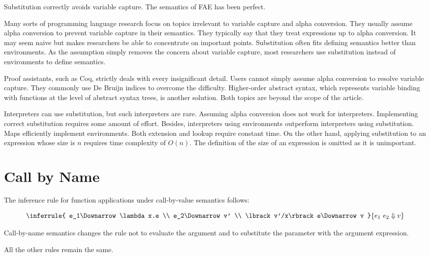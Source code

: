 Substitution correctly avoids variable capture. The semantics of FAE has been
perfect.

Many sorts of programming language research focus on topics irrelevant to
variable capture and alpha conversion. They usually assume alpha conversion to
prevent variable capture in their semantics. They typically say that they treat
expressions up to alpha conversion. It may seem naive but makes researchers be
able to concentrate on important points. Substitution often fits defining
semantics better than environments. As the assumption simply removes the concern
about variable capture, most researchers use substitution instead of environments
to define semantics.

Proof assistants, such as Coq, strictly deals with every insignificant detail.
Users cannot simply assume alpha conversion to resolve variable capture. They
commonly use De Bruijn indices to overcome the difficulty. Higher-order abstract
syntax, which represents variable binding with functions at the level of abstract
syntax trees, is another solution. Both topics are beyond the scope of the
article.

Interpreters can use substitution, but such interpreters are rare. Assuming alpha
conversion does not work for interpreters. Implementing correct substitution
requires some amount of effort. Besides, interpreters using environments
outperform interpreters using substitution. Maps efficiently implement
environments. Both extension and lookup require constant time. On the other hand,
applying substitution to an expression whose size is \(n\) requires time
complexity of \(O(n)\). The definition of the size of an expression is omitted as
it is unimportant.

\section{Call by Name
}

The inference rule for function applications under call-by-value semantics
follows:

\[
\inferrule{
  e_1\Downarrow \lambda x.e \\
  e_2\Downarrow v' \\
  \lbrack v'/x\rbrack e\Downarrow v
}
{ e_1\ e_2\Downarrow v }
\]

Call-by-name semantics changes the rule not to evaluate the argument and to
substitute the parameter with the argument expression.

All the other rules remain the same.

